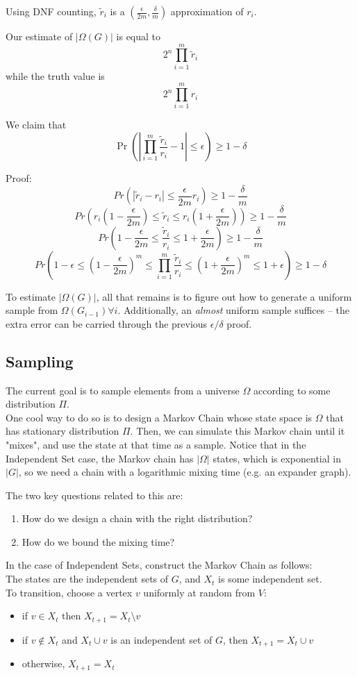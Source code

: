Using DNF counting, $\tilde r_i$ is a $(\frac{\epsilon}{2m}, \frac{\delta}{m})$ approximation of $r_i$.

Our estimate of $|\Omega(G)|$ is equal to
\[ 2^n \prod_{i=1}^m \tilde r_i \]
while the truth value is
\[ 2^n \prod_{i=1}^m r_i \]

We claim that
\[ \Pr\left(|\prod_{i=1}^m \frac{\tilde r_i}{r_i} - 1| \leq \epsilon\right) \geq 1 - \delta \]

Proof:
\[Pr\left( |\tilde r_i - r_i | \leq \frac{\epsilon}{2m}r_i\right) \geq 1 - \frac{\delta}{m}\]
\[Pr\left( r_i(1-\frac{\epsilon}{2m}) \leq \tilde r_i \leq r_i(1+\frac{\epsilon}{2m})\right) \geq 1 - \frac{\delta}{m} \]
\[Pr\left(1 - \frac{\epsilon}{2m} \leq \frac{\tilde r_i}{r_i} \leq 1 + \frac{\epsilon}{2m}\right) \geq 1 - \frac{\delta}{m} \]
\[Pr\left(1 - \epsilon \leq (1 - \frac{\epsilon}{2m})^m \leq \prod_{i=1}^m \frac{\tilde r_i}{r_i} \leq (1 + \frac{\epsilon}{2m})^m \leq 1 + \epsilon\right) \geq 1 - \delta \]

To estimate $|\Omega(G)|$, all that remains is to figure out how to generate a uniform sample from $\Omega(G_{i-1}) \forall i$.
Additionally, an \emph{almost} uniform sample suffices -- the extra error can be carried through the previous $\epsilon/\delta$ proof.

\subsection{Sampling}
The current goal is to sample elements from a universe $\Omega$ according to some distribution $\Pi$. \\
  One cool way to do so is to design a Markov Chain whose state space is $\Omega$ that has stationary distribution $\Pi$. Then, we can simulate this Markov chain until it "mixes", and use the state at that time as a sample. Notice that in the Independent Set case, the Markov chain has $|\Omega|$ states, which is exponential in $|G|$, so we need a chain with a logarithmic mixing time (e.g. an expander graph).

The two key questions related to this are:
\begin{enumerate}
\item How do we design a chain with the right distribution?
\item How do we bound the mixing time?
\end{enumerate}

In the case of Independent Sets, construct the Markov Chain as follows:\\
  The states are the independent sets of $G$, and $X_t$ is some independent set.\\
  To transition, choose a vertex $v$ uniformly at random from $V$:
\begin{itemize}
\item if $v \in X_t$ then $X_{t+1} = X_t \setminus v$
\item if $v \notin X_t$ and $X_t \cup v$ is an independent set of $G$, then $X_{t+1} = X_t \cup v$
\item otherwise, $X_{t+1} = X_t$
\end{itemize}

